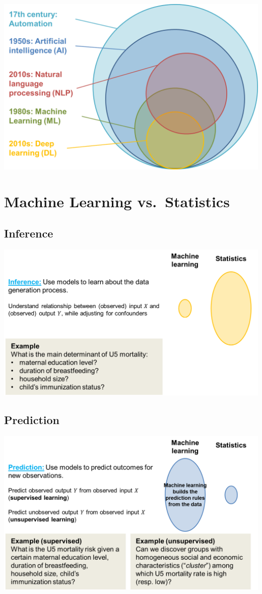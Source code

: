\documentclass[
  letterpaper,
  DIV=11,
  numbers=noendperiod,
  oneside]{scrreprt}
\begin{document}
\includegraphics{images/paste-FA238456.png}

\hypertarget{machine-learning-vs.-statistics}{%
\section{Machine Learning
vs.~Statistics}\label{machine-learning-vs.-statistics}}

\subsection{Inference}

\includegraphics{images/paste-C70B4C10.png}

\subsection{Prediction}

\includegraphics{images/paste-2C4E6936.png}
\end{document}
